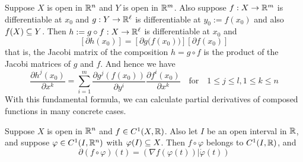 \begin{corollary}
Suppose $X$ is open in $\mathbb{R}^n$ and $Y$ is open in $\mathbb{R}^m$. Also suppose $f:X\to \mathbb{R}^m$ is differentiable at $x_0$ and $g:Y\to\mathbb{R}^\ell $ is differentiable at $y_0:=f(x_0)$ and also $f(X) \subseteq Y$. Then $h:=g\circ f: X\to\mathbb{R}^{\ell}$ is differentiable at $x_0$ and
\[[\partial h(x_0)]=[\partial g\big(f(x_0)\big)][\partial f(x_0)]\]
that is, the Jacobi matrix of the composition $h=g\circ f$ is the product of the Jacobi matrices of $g$ and $f$. And hence we have
\[\dfrac{\partial h^j(x_0)}{\partial x^k}=\sum_{i=1}^{m}\dfrac{\partial g^j(f(x_0))}{\partial y^i}\dfrac{\partial f^i(x_0)}{\partial x^k}\quad \text{for}\quad 1\leq j\leq l,1\leq k\leq n\]
With this fundamental formula, we can calculate partial derivatives of composed functions in many concrete cases.
\end{corollary}
\begin{corollary}
Suppose $X$ is open in $\mathbb{R}^n$ and $f\in C^1(X,\mathbb{R})$. Also let $I$ be an open interval in $\mathbb{R}$, and suppose $\varphi\in C^1(I,\mathbb{R}^n)$ with $\varphi(I)\subseteq X$. Then $f\circ\varphi$ belongs to $C^1(I,\mathbb{R})$, and
\[\partial(f\circ \varphi)(t)=(\nabla f(\varphi(t))|\dot{\varphi}(t))\]
\end{corollary}
